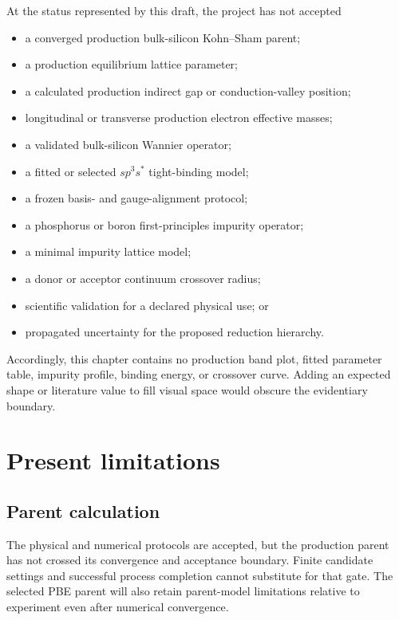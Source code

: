 At the status represented by this draft, the project has not accepted

\begin{itemize}
  \item a converged production bulk-silicon Kohn--Sham parent;
  \item a production equilibrium lattice parameter;
  \item a calculated production indirect gap or conduction-valley position;
  \item longitudinal or transverse production electron effective masses;
  \item a validated bulk-silicon Wannier operator;
  \item a fitted or selected $sp^3s^{\ast}$ tight-binding model;
  \item a frozen basis- and gauge-alignment protocol;
  \item a phosphorus or boron first-principles impurity operator;
  \item a minimal impurity lattice model;
  \item a donor or acceptor continuum crossover radius;
  \item scientific validation for a declared physical use; or
  \item propagated uncertainty for the proposed reduction hierarchy.
\end{itemize}

Accordingly, this chapter contains no production band plot, fitted parameter
table, impurity profile, binding energy, or crossover curve. Adding an expected
shape or literature value to fill visual space would obscure the evidentiary
boundary.

\section{Present limitations}

\subsection{Parent calculation}

The physical and numerical protocols are accepted, but the production parent
has not crossed its convergence and acceptance boundary. Finite candidate
settings and successful process completion cannot substitute for that gate.
The selected PBE parent will also retain parent-model limitations relative to
experiment even after numerical convergence.

